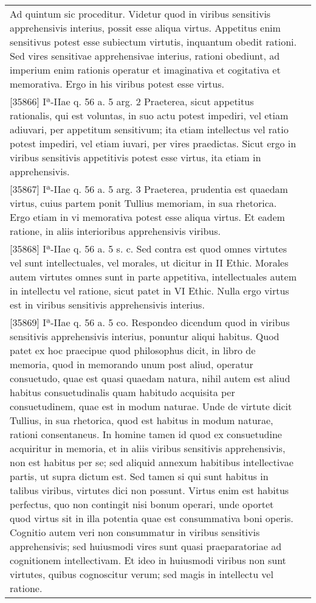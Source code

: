 \documentclass[10pt]{jsarticle}
\begin{document}
\begin{longtable}{p{21em}p{21em}}
Ad quintum sic proceditur. Videtur quod in viribus sensitivis apprehensivis interius, possit esse aliqua virtus. Appetitus enim sensitivus potest esse subiectum virtutis, inquantum obedit rationi. Sed vires sensitivae apprehensivae interius, rationi obediunt, ad imperium enim rationis operatur et imaginativa et cogitativa et memorativa. Ergo in his viribus potest esse virtus.

&

\\


[35866] Iª-IIae q. 56 a. 5 arg. 2
Praeterea, sicut appetitus rationalis, qui est voluntas, in suo actu potest impediri, vel etiam adiuvari, per appetitum sensitivum; ita etiam intellectus vel ratio potest impediri, vel etiam iuvari, per vires praedictas. Sicut ergo in viribus sensitivis appetitivis potest esse virtus, ita etiam in apprehensivis.

&


\\


[35867] Iª-IIae q. 56 a. 5 arg. 3
Praeterea, prudentia est quaedam virtus, cuius partem ponit Tullius memoriam, in sua rhetorica. Ergo etiam in vi memorativa potest esse aliqua virtus. Et eadem ratione, in aliis interioribus apprehensivis viribus.

&

\\


[35868] Iª-IIae q. 56 a. 5 s. c.
Sed contra est quod omnes virtutes vel sunt intellectuales, vel morales, ut dicitur in II Ethic. Morales autem virtutes omnes sunt in parte appetitiva, intellectuales autem in intellectu vel ratione, sicut patet in VI Ethic. Nulla ergo virtus est in viribus sensitivis apprehensivis interius.

&

\\


[35869] Iª-IIae q. 56 a. 5 co.
Respondeo dicendum quod in viribus sensitivis apprehensivis interius, ponuntur aliqui habitus. Quod patet ex hoc praecipue quod philosophus dicit, in libro de memoria, quod in memorando unum post aliud, operatur consuetudo, quae est quasi quaedam natura, nihil autem est aliud habitus consuetudinalis quam habitudo acquisita per consuetudinem, quae est in modum naturae. Unde de virtute dicit Tullius, in sua rhetorica, quod est habitus in modum naturae, rationi consentaneus. In homine tamen id quod ex consuetudine acquiritur in memoria, et in aliis viribus sensitivis apprehensivis, non est habitus per se; sed aliquid annexum habitibus intellectivae partis, ut supra dictum est. Sed tamen si qui sunt habitus in talibus viribus, virtutes dici non possunt. Virtus enim est habitus perfectus, quo non contingit nisi bonum operari, unde oportet quod virtus sit in illa potentia quae est consummativa boni operis. Cognitio autem veri non consummatur in viribus sensitivis apprehensivis; sed huiusmodi vires sunt quasi praeparatoriae ad cognitionem intellectivam. Et ideo in huiusmodi viribus non sunt virtutes, quibus cognoscitur verum; sed magis in intellectu vel ratione.


\end{longtable}
\end{document}
